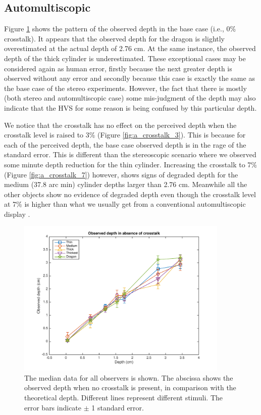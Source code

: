 \subsection{Automultiscopic}


Figure \ref{fig:a_crosstalk_0} shows the pattern of the observed depth in the base case (i.e., 0\% crosstalk). It appears that the observed depth for the dragon is slightly overestimated at the actual depth of 2.76 cm. At the same instance, the observed depth of the thick cylinder is underestimated. These exceptional cases may be considered again as human error, firstly because the next greater depth is observed without any error and secondly because this case is exactly the same as the base case of the stereo experiments. However, the fact that there is mostly (both stereo and automultiscopic case) some mis-judgment of the depth may also indicate that the HVS for some reason is being confused by this particular depth.

We notice that the crosstalk has no effect on the perceived depth when the crosstalk level is raised to 3\% (Figure \ref{fig:a_crosstalk_3}). This is because for each of the perceived depth, the base case observed depth is in the rage of the standard error. This is different than the stereoscopic scenario where we observed some minute depth reduction for the thin cylinder. Increasing the crosstalk to 7\% (Figure \ref{fig:a_crosstalk_7}) however, shows signs of degraded depth for the medium (37.8 arc min) cylinder depths larger than 2.76 cm. Meanwhile all the other objects show no evidence of degraded depth even though the crosstalk level at 7\% is higher than what we usually get from a conventional automultiscopic display \cite{woods2012crosstalk}.
\begin{figure}[H]
\centering
    \includegraphics[width=0.9\textwidth]{./Template_Figures/a_crosstalk_0}
    \caption{The median data for all observers is shown. The abscissa shows the observed depth when no crosstalk is present, in comparison with the theoretical depth. Different lines represent different stimuli. The error bars indicate $\pm$ 1 standard error.\label{fig:a_crosstalk_0}}
\end{figure}

